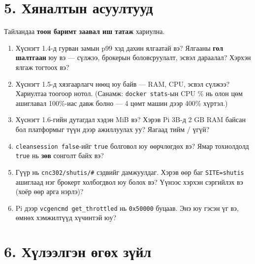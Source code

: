 \hypertarget{ux445ux44fux43dux430ux43bux442ux44bux43d-ux430ux441ux443ux443ux43bux442ux443ux443ux434}{%
\section{5. Хяналтын асуултууд}\label{ux445ux44fux43dux430ux43bux442ux44bux43d-ux430ux441ux443ux443ux43bux442ux443ux443ux434}}

Тайландаа \textbf{тоон баримт заавал иш татаж} хариулна.

\begin{enumerate}
\def\labelenumi{\arabic{enumi}.}
\item
  Хүснэгт 1.4-д гурван замын p99 хэд дахин ялгаатай вэ? Ялгааны \textbf{гол шалтгаан} юу вэ --- сүлжээ, брокерын боловсруулалт, эсвэл дараалал? Хэрхэн ялгаж тогтоох вэ?
\item
  Хүснэгт 1.5-д хязгаарлагч нөөц юу байв --- RAM, CPU, эсвэл сүлжээ? Хариултаа тоогоор нотол. (Санамж: \texttt{docker\ stats}-ын CPU \% нь олон цөм ашиглавал 100\%-иас давж болно --- 4 цөмт машин дээр 400\% хүртэл.)
\item
  Хүснэгт 1.6-гийн дутагдал хэдэн MiB вэ? Хэрэв Pi 3B-д 2 GB RAM байсан бол платформыг түүн дээр ажиллуулах уу? Яагаад тийм / үгүй?
\item
  \texttt{cleansession\ false}-ийг \texttt{true} болговол юу өөрчлөгдөх вэ? Ямар тохиолдолд \texttt{true} нь \textbf{зөв} сонголт байх вэ?
\item
  Гүүр нь \texttt{cnc302/shutis/\#} сэдвийг дамжуулдаг. Хэрэв өөр баг \texttt{SITE=shutis} ашиглаад нэг брокерт холбогдвол юу болох вэ? Үүнээс хэрхэн сэргийлэх вэ (хоёр өөр арга нэрлэ)?
\item
  Pi дээр \texttt{vcgencmd\ get\_\allowbreak{}throttled} нь \texttt{0x50000} буцаав. Энэ юу гэсэн үг вэ, өмнөх хэмжилтүүд хүчинтэй юу?
\end{enumerate}

\hypertarget{ux445ux4afux43bux44dux44dux43bux433ux44dux43d-ux4e9ux433ux4e9ux445-ux437ux4afux439ux43b}{%
\section{6. Хүлээлгэн өгөх зүйл}\label{ux445ux4afux43bux44dux44dux43bux433ux44dux43d-ux4e9ux433ux4e9ux445-ux437ux4afux439ux43b}}

